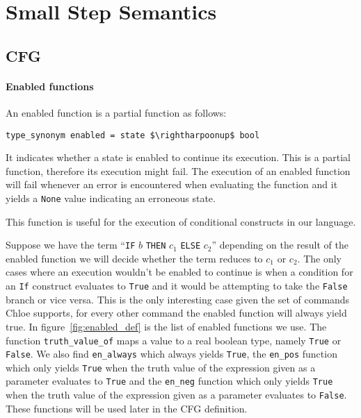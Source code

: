 \section{Small Step Semantics}\label{section:small_step}

\begin{comment}
add a little summary here.
\end{comment}

\subsection{CFG}\label{subsection:cfg}

\paragraph{Enabled functions}\label{paragraph:enabled}

An enabled function is a partial function as follows:

\begin{lstlisting}[mathescape=true, frame=single]
type_synonym enabled = state $\rightharpoonup$ bool
\end{lstlisting}

It indicates whether a state is enabled to continue its execution.
This is a partial function, therefore its execution might fail.
The execution of an enabled function will fail whenever an error is encountered when evaluating the function and it yields a \verb|None| value indicating an erroneous state.

This function is useful for the execution of conditional constructs in our language.

Suppose we have the term ``\verb|IF| $b$ \verb|THEN| $c_{1}$ \verb|ELSE| $c_{2}$'' depending on the result of the enabled function we will decide whether the term reduces to $c_{1}$ or $c_{2}$.
The only cases where an execution wouldn't be enabled to continue is when a condition for an \verb|If| construct evaluates to \verb|True| and it would be attempting to take the \verb|False| branch or vice versa.
This is the only interesting case given the set of commands Chloe supports, for every other command the enabled function will always yield true.
In figure~\ref{fig:enabled_def} is the list of enabled functions we use.
The function \verb|truth_value_of| maps a value to a real boolean type, namely \verb|True| or \verb|False|.
We also find \verb|en_always| which always yields \verb|True|, the \verb|en_pos| function which only yields \verb|True| when the truth value of the expression given as a parameter evaluates to \verb|True| and the \verb|en_neg| function which only yields \verb|True| when the truth value of the expression given as a parameter evaluates to \verb|False|.
These functions will be used later in the CFG definition.


